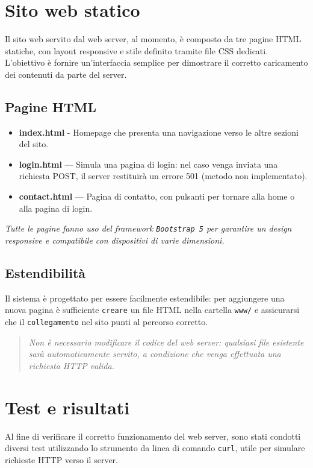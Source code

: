 \documentclass[a4paper,12pt]{report}
\begin{document}
\chapter{Sito web statico}
Il sito web servito dal web server, al momento, è composto da tre pagine HTML statiche, con layout responsive e stile definito
tramite file CSS dedicati. L'obiettivo è fornire un'interfaccia semplice per dimostrare il corretto caricamento dei contenuti
da parte del server.

\section{Pagine HTML}

\begin{itemize}
	\item \textbf{index.html} - Homepage che presenta una navigazione verso le altre sezioni del sito.
	\item \textbf{login.html} — Simula una pagina di login: nel caso venga inviata una richiesta POST, il server restituirà un errore 501 (metodo non implementato).
	\item \textbf{contact.html} — Pagina di contatto, con pulsanti per tornare alla home o alla pagina di login.
\end{itemize}
%
\textit{Tutte le pagine fanno uso del framework \texttt{Bootstrap 5} per garantire un design responsive e compatibile con dispositivi di varie dimensioni.}

\section{Estendibilità}

Il sistema è progettato per essere facilmente estendibile: per aggiungere una nuova pagina è sufficiente \texttt{creare} un file HTML nella cartella
\texttt{www/} e assicurarsi che il \texttt{collegamento} nel sito punti al percorso corretto.

\begin{quote}
	\textit{Non è necessario modificare il codice del web server: qualsiasi file esistente sarà automaticamente servito, a condizione che venga effettuata una richiesta HTTP valida.}
\end{quote}


\chapter{Test e risultati}
Al fine di verificare il corretto funzionamento del web server, sono stati condotti diversi test utilizzando lo strumento da linea di comando \texttt{curl}, utile per simulare
richieste HTTP verso il server.
\end{document}
